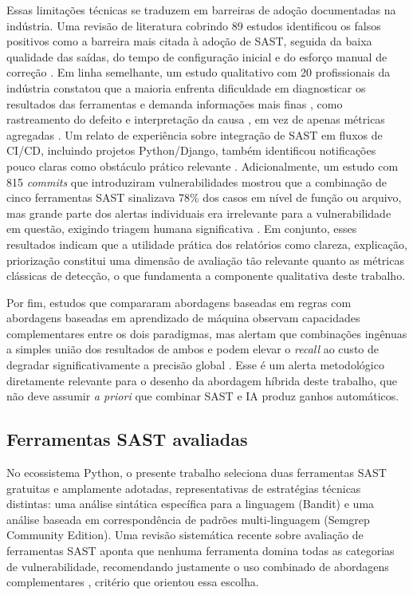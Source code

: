 Essas limitações técnicas se traduzem em barreiras de adoção documentadas na indústria. Uma revisão de literatura cobrindo 89 estudos identificou os falsos positivos como a barreira mais citada à adoção de SAST, seguida da baixa qualidade das saídas, do tempo de configuração inicial e do esforço manual de correção \cite{Wadhams2024SASTBarriers}. Em linha semelhante, um estudo qualitativo com 20 profissionais da indústria constatou que a maioria enfrenta dificuldade em diagnosticar os resultados das ferramentas e demanda informações mais finas , como rastreamento do defeito e interpretação da causa , em vez de apenas métricas agregadas \cite{Li2025IndustrySAST}. Um relato de experiência sobre integração de SAST em fluxos de CI/CD, incluindo projetos Python/Django, também identificou notificações pouco claras como obstáculo prático relevante \cite{Chembakottu2025SASTUsability}. Adicionalmente, um estudo com 815 \textit{commits} que introduziram vulnerabilidades mostrou que a combinação de cinco ferramentas SAST sinalizava 78\% dos casos em nível de função ou arquivo, mas grande parte dos alertas individuais era irrelevante para a vulnerabilidade em questão, exigindo triagem humana significativa \cite{Charoenwet2024SecureReview}. Em conjunto, esses resultados indicam que a utilidade prática dos relatórios como clareza, explicação, priorização  constitui uma dimensão de avaliação tão relevante quanto as métricas clássicas de detecção, o que fundamenta a componente qualitativa deste trabalho.

Por fim, estudos que compararam abordagens baseadas em regras com abordagens baseadas em aprendizado de máquina observam capacidades complementares entre os dois paradigmas, mas alertam que combinações ingênuas a simples união dos resultados de ambos e podem elevar o \textit{recall} ao custo de degradar significativamente a precisão global \cite{Croft2021RuleLearningSAST}. Esse é um alerta metodológico diretamente relevante para o desenho da abordagem híbrida deste trabalho, que não deve assumir \textit{a priori} que combinar SAST e IA produz ganhos automáticos.


\subsection{Ferramentas SAST avaliadas}\label{subsec:ferramentas-sast}
No ecossistema Python, o presente trabalho seleciona duas ferramentas SAST gratuitas e amplamente adotadas, representativas de estratégias técnicas distintas: uma análise sintática específica para a linguagem (Bandit) e uma análise baseada em correspondência de padrões multi-linguagem (Semgrep Community Edition). Uma revisão sistemática recente sobre avaliação de ferramentas SAST aponta que nenhuma ferramenta domina todas as categorias de vulnerabilidade, recomendando justamente o uso combinado de abordagens complementares \cite{Dalaq2025SASTSLR} , critério que orientou essa escolha.


